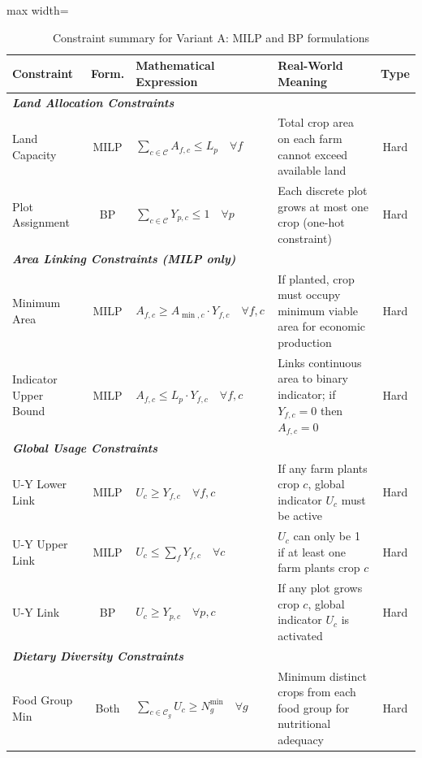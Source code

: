 \documentclass{oqireport}
\begin{document}
\begin{table}[H]
\centering
\caption{Constraint summary for Variant A: MILP and BP formulations}
\label{tab:variant_a_constraints}
\small
\begin{adjustbox}{max width=\textwidth}
\begin{tabular}{@{}p{2.5cm}cp{4.8cm}p{4.5cm}c@{}}
\toprule
\textbf{Constraint} & \textbf{Form.} & \textbf{Mathematical Expression} & \textbf{Real-World Meaning} & \textbf{Type} \\
\midrule
\multicolumn{5}{l}{\textit{\textbf{Land Allocation Constraints}}} \\
\midrule
Land Capacity & MILP & $\sum_{c \in \mathcal{C}} A_{f,c} \leq L_p \quad \forall f$ & Total crop area on each farm cannot exceed available land & Hard \\
\addlinespace
Plot Assignment & BP & $\sum_{c \in \mathcal{C}} Y_{p,c} \leq 1 \quad \forall p$ & Each discrete plot grows at most one crop (one-hot constraint) & Hard \\
\midrule
\multicolumn{5}{l}{\textit{\textbf{Area Linking Constraints (MILP only)}}} \\
\midrule
Minimum Area & MILP & $A_{f,c} \geq A_{\min,c} \cdot Y_{f,c} \quad \forall f,c$ & If planted, crop must occupy minimum viable area for economic production & Hard \\
\addlinespace
Indicator Upper Bound & MILP & $A_{f,c} \leq L_p \cdot Y_{f,c} \quad \forall f,c$ & Links continuous area to binary indicator; if $Y_{f,c}=0$ then $A_{f,c}=0$ & Hard \\
\midrule
\multicolumn{5}{l}{\textit{\textbf{Global Usage Constraints}}} \\
\midrule
U-Y Lower Link & MILP & $U_c \geq Y_{f,c} \quad \forall f,c$ & If any farm plants crop $c$, global indicator $U_c$ must be active & Hard \\
\addlinespace
U-Y Upper Link & MILP & $U_c \leq \sum_{f} Y_{f,c} \quad \forall c$ & $U_c$ can only be 1 if at least one farm plants crop $c$ & Hard \\
\addlinespace
U-Y Link & BP & $U_c \geq Y_{p,c} \quad \forall p,c$ & If any plot grows crop $c$, global indicator $U_c$ is activated & Hard \\
\midrule
\multicolumn{5}{l}{\textit{\textbf{Dietary Diversity Constraints}}} \\
\midrule
Food Group Min & Both & $\sum_{c \in \mathcal{C}_g} U_c \geq N_g^{\min} \quad \forall g$ & Minimum distinct crops from each food group for nutritional adequacy & Hard \\

\end{tabular}
\end{adjustbox}
\end{table}
\end{document}
